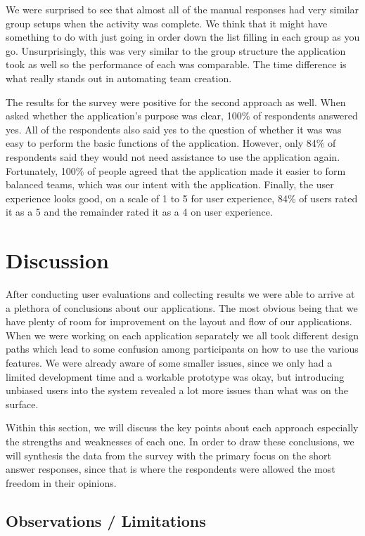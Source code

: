 \documentclass[conference]{IEEEtran}
\begin{document}
We were surprised to see that almost all of the manual responses had very similar group setups when the activity was complete. We think that it might have something to do with just going in order down the list filling in each group as you go. Unsurprisingly, this was very similar to the group structure the application took as well so the performance of each was comparable. The time difference is what really stands out in automating team creation.

The results for the survey were positive for the second approach as well. When asked whether the application's purpose was clear, 100\% of respondents answered yes. All of the respondents also said yes to the question of whether it was was easy to perform the basic functions of the application. However, only 84\% of respondents said they would not need assistance to use the application again. Fortunately, 100\% of people agreed that the application made it easier to form balanced teams, which was our intent with the application. Finally, the user experience looks good, on a scale of 1 to 5 for user experience, 84\% of users rated it as a 5 and the remainder rated it as a 4 on user experience. 


\section{Discussion}
After conducting user evaluations and collecting results we were able to arrive at a plethora of conclusions about our applications. The most obvious being that we have plenty of room for improvement on the layout and flow of our applications. When we were working on each application separately we all took different design paths which lead to some confusion among participants on how to use the various features. We were already aware of some smaller issues, since we only had a limited development time and a workable prototype was okay, but introducing unbiased users into the system revealed a lot more issues than what was on the surface. 

Within this section, we will discuss the key points about each approach especially the strengths and weaknesses of each one. In order to draw these conclusions, we will synthesis the data from the survey with the primary focus on the short answer responses, since that is where the respondents were allowed the most freedom in their opinions. 

\subsection{Observations / Limitations}
\end{document}

